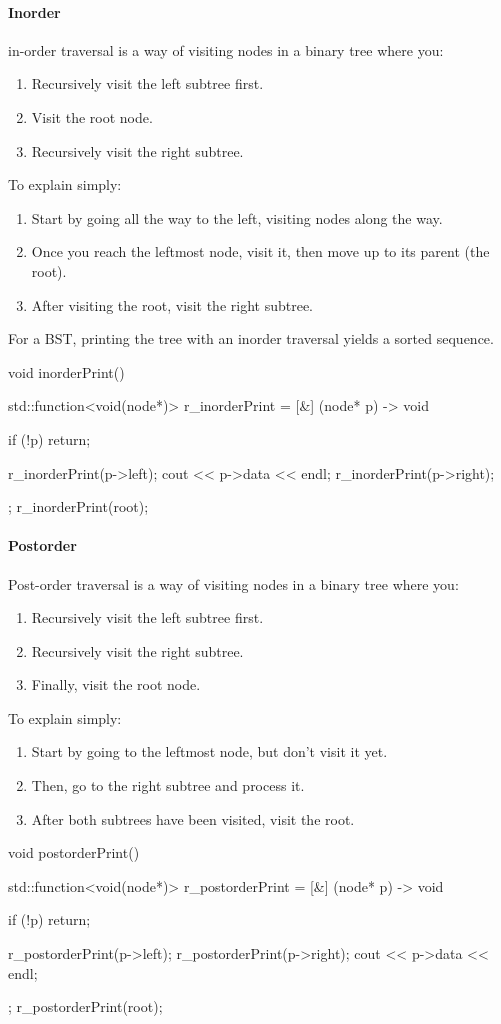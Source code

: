 \documentclass{report}
\begin{document}
\paragraph{Inorder}
\bigbreak \noindent\bigbreak \noindent  
in-order traversal is a way of visiting nodes in a binary tree where you:
\begin{enumerate}
    \item Recursively visit the left subtree first.
    \item Visit the root node.
    \item Recursively visit the right subtree.
\end{enumerate}
To explain simply:
\begin{enumerate}
    \item Start by going all the way to the left, visiting nodes along the way.
    \item Once you reach the leftmost node, visit it, then move up to its parent (the root).
    \item After visiting the root, visit the right subtree.
\end{enumerate}
\bigbreak \noindent 
For a BST, printing the tree with an inorder traversal yields a sorted sequence.
\bigbreak \noindent 
\begin{cppcode}
    void inorderPrint() {
        std::function<void(node*)> r_inorderPrint = [&] (node* p) -> void {
            if (!p) return;

            r_inorderPrint(p->left);
            cout << p->data << endl;
            r_inorderPrint(p->right);
        };
        r_inorderPrint(root);
    }
\end{cppcode}

\pagebreak 
\paragraph{Postorder}
\bigbreak \noindent \bigbreak \noindent 
Post-order traversal is a way of visiting nodes in a binary tree where you:
\begin{enumerate}
    \item Recursively visit the left subtree first.
    \item Recursively visit the right subtree.
    \item Finally, visit the root node.
\end{enumerate}
To explain simply:
\begin{enumerate}
    \item Start by going to the leftmost node, but don't visit it yet.
    \item Then, go to the right subtree and process it.
    \item After both subtrees have been visited, visit the root.
\end{enumerate}
\bigbreak \noindent 
\begin{cppcode}
    void postorderPrint() {
        std::function<void(node*)> r_postorderPrint = [&] (node* p) -> void {
            if (!p) return;

            r_postorderPrint(p->left);
            r_postorderPrint(p->right);
            cout << p->data << endl;
        };
        r_postorderPrint(root);
    }
\end{cppcode}
\end{document}
